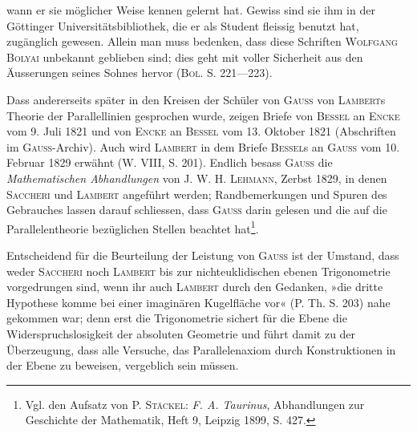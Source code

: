 wann er sie möglicher Weise kennen gelernt hat. Gewiss sind sie ihm in
der Göttinger Universitätsbibliothek, die er als Student fleissig benutzt hat,
\clearpage{}\setcounter{footnote}{0}
\noindent zugänglich gewesen. Allein man muss bedenken, dass diese Schriften \textsc{Wolfgang
Bolyai} unbekannt geblieben sind; dies geht mit voller Sicherheit aus
den Äusserungen seines Sohnes hervor (\textsc{Bol.} S. 221—223).
\par
Dass andererseits später in den Kreisen der Schüler von \textsc{Gauss} von \textsc{Lambert}s
Theorie der Parallellinien gesprochen wurde, zeigen Briefe von \textsc{Bessel}
an \textsc{Encke} vom 9. Juli 1821 und von \textsc{Encke} an \textsc{Bessel} vom 13. Oktober 1821
(Abschriften im \textsc{Gauss}-Archiv). Auch wird \textsc{Lambert} in dem Briefe \textsc{Bessel}s
an \textsc{Gauss} vom 10. Februar 1829 erwähnt (W. VIII, S. 201). Endlich besass
\textsc{Gauss} die \textit{Mathematischen Abhandlungen} von J. W. H. \textsc{Lehmann}, Zerbst 1829,
in denen \textsc{Saccheri} und \textsc{Lambert} angeführt werden; Randbemerkungen und
Spuren des Gebrauches lassen darauf schliessen, dass \textsc{Gauss} darin gelesen und
die auf die Parallelentheorie bezüglichen Stellen beachtet hat\footnote{Vgl. den Aufsatz von P. \textsc{Stäckel}: \textit{F. A. Taurinus}, Abhandlungen zur Geschichte der Mathematik, Heft 9, Leipzig 1899, S. 427.}.
\par
Entscheidend für die Beurteilung der Leistung von \textsc{Gauss} ist der Umstand,
dass weder \textsc{Saccheri} noch \textsc{Lambert} bis zur nichteuklidischen ebenen Trigonometrie
vorgedrungen sind, wenn ihr auch \textsc{Lambert} durch den Gedanken, »die
dritte Hypothese komme bei einer imaginären Kugelfläche vor« (P. Th. S. 203)
nahe gekommen war; denn erst die Trigonometrie sichert für die Ebene die
Widerspruchslosigkeit der absoluten Geometrie und führt damit zu der Überzeugung,
dass alle Versuche, das Parallelenaxiom durch Konstruktionen in
der Ebene zu beweisen, vergeblich sein müssen.
\clearpage\endgroup
